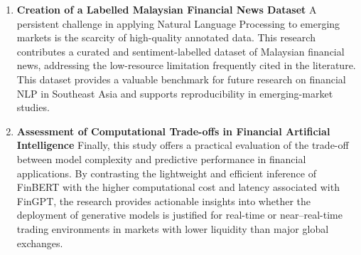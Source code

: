 \documentclass[singlespace]{ucetd}
\begin{document}
\begin{enumerate}
    \item \textbf{Creation of a Labelled Malaysian Financial News Dataset}  
    A persistent challenge in applying Natural Language Processing to emerging markets is the scarcity of high-quality annotated data. This research contributes a curated and sentiment-labelled dataset of Malaysian financial news, addressing the low-resource limitation frequently cited in the literature. This dataset provides a valuable benchmark for future research on financial NLP in Southeast Asia and supports reproducibility in emerging-market studies.

    \item \textbf{Assessment of Computational Trade-offs in Financial Artificial Intelligence}  
    Finally, this study offers a practical evaluation of the trade-off between model complexity and predictive performance in financial applications. By contrasting the lightweight and efficient inference of FinBERT with the higher computational cost and latency associated with FinGPT, the research provides actionable insights into whether the deployment of generative models is justified for real-time or near–real-time trading environments in markets with lower liquidity than major global exchanges.
\end{enumerate}
\end{document}
